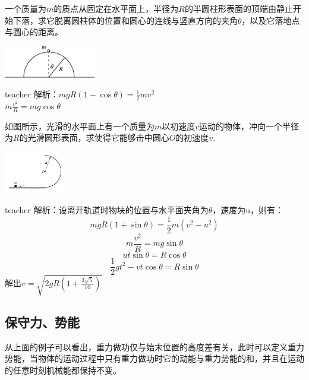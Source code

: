 \begin{example}
	一个质量为$m$的质点从固定在水平面上，半径为$R$的半圆柱形表面的顶端由静止开始下落，求它脱离圆柱体的位置和圆心的连线与竖直方向的夹角$\theta$，以及它落地点与圆心的距离。
		\begin{flushright}
			\includegraphics[width = 0.3\textwidth]{images/energy-8.pdf} 
		\end{flushright}
	\begin{taggedblock}{teacher}
		\noindent
		解析：$mgR(1-\cos\theta)=\frac{1}{2}mv^2$   \\ $m\frac{v^2}{R}=mg\cos\theta$
	\end{taggedblock}
\end{example}

\begin{example}

如图所示，光滑的水平面上有一个质量为$m$以初速度$v$运动的物体，冲向一个半径为$R$的光滑圆形表面，求使得它能够击中圆心$O$的初速度$v$.
\begin{flushright}
\includegraphics[width = 0.2\textwidth]{images/energy-6.pdf}
\end{flushright}
	\begin{taggedblock}{teacher}
		\noindent
		解析：设离开轨道时物块的位置与水平面夹角为$\theta$，速度为u，则有：
		\[mgR(1+\sin\theta)=\frac{1}{2}m(v^2-u^2)\]
		\[m\frac{v^2}{R}=mg\sin\theta\]
		\[ut\sin\theta=R\cos\theta\]
		\[\frac{1}{2}gt^2-vt\cos\theta=R\sin\theta\]
		解出$v=\sqrt{2gR(1+\frac{3\sqrt{5}}{10})}$
	\end{taggedblock}
\end{example}

\subsection{保守力、势能}
从上面的例子可以看出，重力做功仅与始末位置的高度差有关，此时可以定义重力势能，当物体的运动过程中只有重力做功时它的动能与重力势能的和，并且在运动的任意时刻机械能都保持不变。

